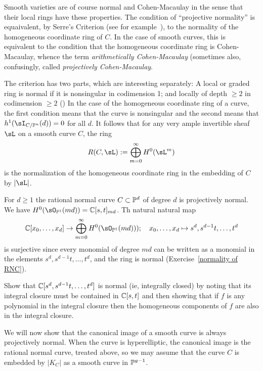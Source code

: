  
\begin{remark}
 Smooth varieties are of course normal and Cohen-Macaulay in the sense that their local rings have these properties. The condition of ``projective normality'' is equaivalent, by Serre's Criterion (see for example~\cite[Section 11.2]{Eisenbud1995}), to the normality of the homogeneous coordinate ring of $C$. In the case of smooth curves, this is equivalent to the condition that the homogeneous coordinate
ring is Cohen-Macaulay, whence the term \emph{arithmetically Cohen-Macaulay} (sometimes also, confusingly, called
\emph{projectively Cohen-Macaulay}.
\end{remark}

 The criterion has two parts, which are interesting separately: A local or graded ring is normal if it is nonsingular in
codimension 1; and
locally of depth $\geq 2$ in codimension $\geq 2$ (\cite[Theorem 11.5]{Eisenbud1995}) In the case of the homogeneous coordinate ring of a curve, 
the first condition means that the curve is nonsingular and the second means that $h^1(\sI_{C/\PP^n}(d))=0$ for all $d$.
It follows that for any very ample invertible sheaf $\sL$ on a smooth curve $C$, the ring 
$$
R(C, \sL) := \bigoplus_{m=0}^\infty H^0(\sL^m)
$$
is the normalization of the homogeneous coordinate ring in the embedding of $C$ by $|\sL|$.

\begin{example}\label{rnc is projectively normal}
For $d\geq 1$ the rational normal curve $C\subset \PP^d$ of degree $d$ is projectively normal. 
We have $H^0(\sO_{\PP^1}(md))  = \CC[s,t]_{md}$. Th natural natural map
$$
\CC[x_0,\dots,x_d] \to\bigoplus_{m = 0}^\infty H^0(\sO_{\PP^1}(md)));\quad x_0,\dots, x_d \mapsto s^d,s^{d-1}t,\dots, t^d
$$ 
is surjective since every monomial of degree $md$ can be written as a monomial in  
the elements $s^d,s^{d-1}t,\dots, t^d$, and the ring is normal (Exercise~\ref{normality of RNC}).
\end{example}

\begin{exercise}\label{normality of RNC}
 Show that $\CC[s^d,s^{d-1}t,\dots, t^d]$ is normal (ie, integrally closed) by noting that its integral closure must be
 contained in $\CC[s,t]$ and then showing that if $f$ is any polynomial
 in the integral closure then the homogeneous components of $f$ are also in the integral closure.
\end{exercise}

We will now show that the canonical image of a smooth curve is always projectively normal. When the curve is hyperelliptic,
the canonical image is the rational normal curve, treated above, so we may assume that the curve $C$ is embedded
by $|K_C|$ as a smooth curve in $\PP^{g-1}$.

